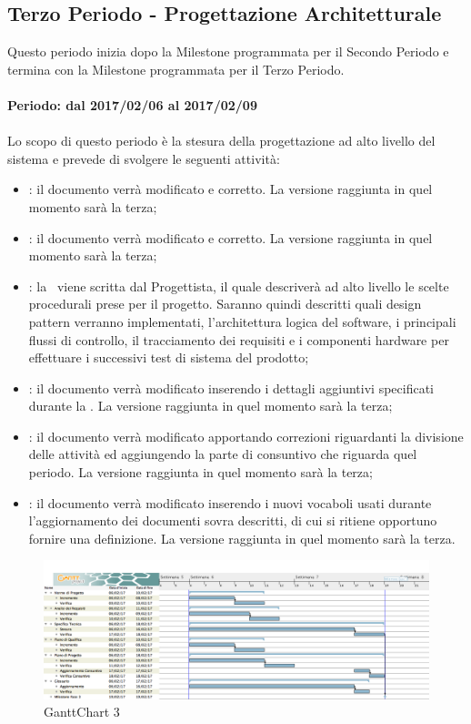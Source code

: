 \documentclass[../PianoDiProgetto.tex]{subfiles}
\begin{document}
	\subsection{Terzo Periodo - Progettazione Architetturale}
	Questo periodo inizia dopo la Milestone programmata per il Secondo Periodo e termina con la Milestone programmata per il Terzo Periodo.
	\\
	\\
	\textbf{Periodo: dal 2017/02/06 al 2017/02/09}
	\\
	\\
	Lo scopo di questo periodo è la stesura della progettazione ad alto livello del sistema e prevede di svolgere le seguenti attività:
	\begin{itemize}
		\item \normediprogetto: il documento verrà modificato e corretto. La versione raggiunta in quel momento sarà la terza;
		\item \analisideirequisiti: il documento verrà modificato e corretto. La versione raggiunta in quel momento sarà la terza;
		\item \specificatecnica: la \specificatecnica\ viene scritta dal Progettista, il quale descriverà ad alto livello le scelte procedurali prese per il progetto. Saranno quindi descritti quali design pattern verranno implementati, l'architettura logica del software, i principali flussi di controllo, il tracciamento dei requisiti e i componenti hardware per effettuare i successivi test di sistema del prodotto;
		\item \pianodiqualifica: il documento verrà modificato inserendo i dettagli aggiuntivi specificati durante la \revisionedeirequisiti. La versione raggiunta in quel momento sarà la terza;
		\item \pianodiprogetto: il documento verrà modificato apportando correzioni riguardanti la divisione delle attività ed aggiungendo la parte di consuntivo che riguarda quel periodo. La versione raggiunta in quel momento sarà la terza;
		\item \glossario: il documento verrà modificato inserendo i nuovi vocaboli usati durante l'aggiornamento dei documenti sovra descritti, di cui si ritiene opportuno fornire una definizione. La versione raggiunta in quel momento sarà la terza.
	\end{itemize}
	
	\begin{figure}[!h]
		\centering
		\includegraphics[width=\textwidth]{Pianificazione/Immagini/GanttChart03.png}
		\caption{GanttChart 3}
	\end{figure}	
	
\end{document}
